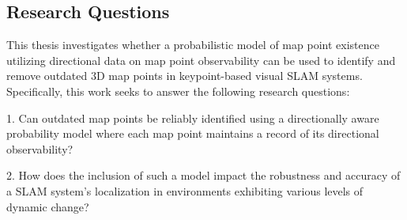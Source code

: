 \subsection{Research Questions}


This thesis investigates whether a probabilistic model of map point existence utilizing directional data on map point observability can be used to identify and remove outdated 3D map points in keypoint-based visual SLAM systems. Specifically, this work seeks to answer the following research questions:

1. Can outdated map points be reliably identified using a directionally aware probability model where each map point maintains a record of its directional observability?

2. How does the inclusion of such a model impact the robustness and accuracy of a SLAM system's localization in environments exhibiting various levels of dynamic change?